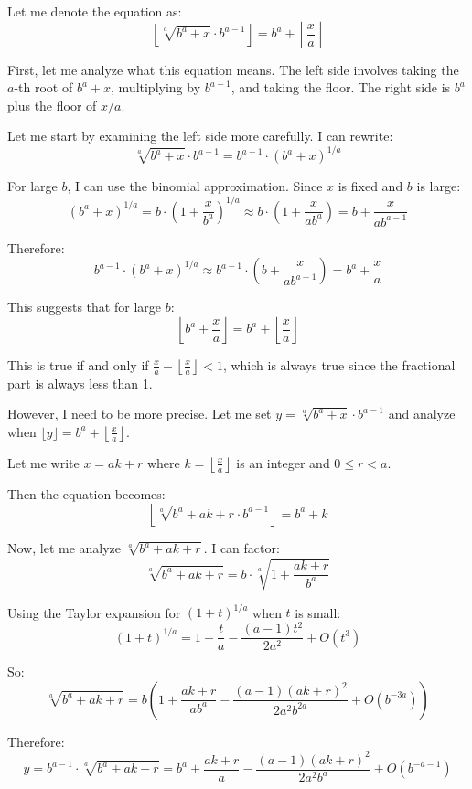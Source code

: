 \documentclass[12pt,a4paper]{article}
\theoremstyle{definition}
\begin{document}
    Let me denote the equation as:
    $$\left\lfloor \sqrt[a]{b^a + x} \cdot b^{a-1} \right\rfloor = b^a + \left\lfloor \frac{x}{a} \right\rfloor$$

    First, let me analyze what this equation means. The left side involves taking the $a$-th root of $b^a + x$, multiplying by $b^{a-1}$, and taking the floor. The right side is $b^a$ plus the floor of $x/a$.

    Let me start by examining the left side more carefully. I can rewrite:
    $$\sqrt[a]{b^a + x} \cdot b^{a-1} = b^{a-1} \cdot (b^a + x)^{1/a}$$

    For large $b$, I can use the binomial approximation. Since $x$ is fixed and $b$ is large:
    $$(b^a + x)^{1/a} = b \cdot \left(1 + \frac{x}{b^a}\right)^{1/a} \approx b \cdot \left(1 + \frac{x}{ab^a}\right) = b + \frac{x}{ab^{a-1}}$$

    Therefore:
    $$b^{a-1} \cdot (b^a + x)^{1/a} \approx b^{a-1} \cdot \left(b + \frac{x}{ab^{a-1}}\right) = b^a + \frac{x}{a}$$

    This suggests that for large $b$:
    $$\left\lfloor b^a + \frac{x}{a} \right\rfloor = b^a + \left\lfloor \frac{x}{a} \right\rfloor$$

    This is true if and only if $\frac{x}{a} - \left\lfloor \frac{x}{a} \right\rfloor < 1$, which is always true since the fractional part is always less than 1.

    However, I need to be more precise. Let me set $y = \sqrt[a]{b^a + x} \cdot b^{a-1}$ and analyze when $\lfloor y \rfloor = b^a + \left\lfloor \frac{x}{a} \right\rfloor$.

    Let me write $x = ak + r$ where $k = \left\lfloor \frac{x}{a} \right\rfloor$ is an integer and $0 \leq r < a$.

    Then the equation becomes:
    $$\left\lfloor \sqrt[a]{b^a + ak + r} \cdot b^{a-1} \right\rfloor = b^a + k$$

    Now, let me analyze $\sqrt[a]{b^a + ak + r}$. I can factor:
    $$\sqrt[a]{b^a + ak + r} = b \cdot \sqrt[a]{1 + \frac{ak + r}{b^a}}$$

    Using the Taylor expansion for $(1 + t)^{1/a}$ when $t$ is small:
    $$(1 + t)^{1/a} = 1 + \frac{t}{a} - \frac{(a-1)t^2}{2a^2} + O(t^3)$$

    So:
    $$\sqrt[a]{b^a + ak + r} = b \left(1 + \frac{ak + r}{ab^a} - \frac{(a-1)(ak + r)^2}{2a^2 b^{2a}} + O(b^{-3a})\right)$$

    Therefore:
    $$y = b^{a-1} \cdot \sqrt[a]{b^a + ak + r} = b^a + \frac{ak + r}{a} - \frac{(a-1)(ak + r)^2}{2a^2 b^{a}} + O(b^{-a-1})$$
\end{document}
